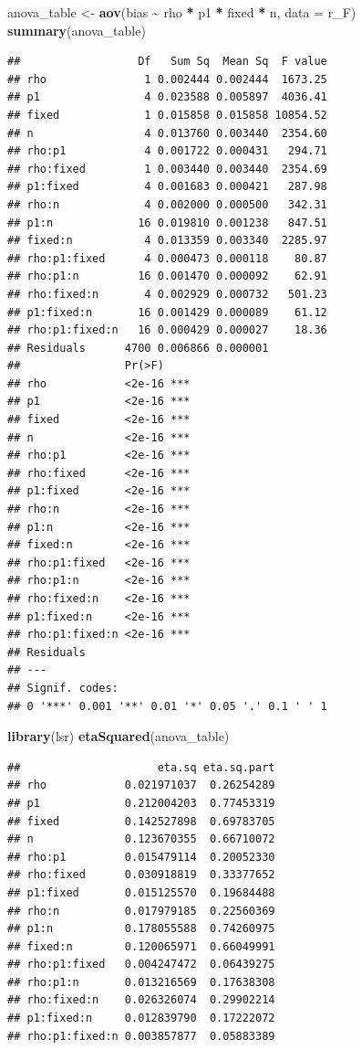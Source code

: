\documentclass[
]{book}
\newenvironment{Shaded}{\begin{snugshade}}{\end{snugshade}}
\newcommand{\AttributeTok}[1]{\textcolor[rgb]{0.13,0.29,0.53}{#1}}
\newcommand{\FunctionTok}[1]{\textcolor[rgb]{0.13,0.29,0.53}{\textbf{#1}}}
\newcommand{\NormalTok}[1]{#1}
\newcommand{\OtherTok}[1]{\textcolor[rgb]{0.56,0.35,0.01}{#1}}
\newcommand{\SpecialCharTok}[1]{\textcolor[rgb]{0.81,0.36,0.00}{\textbf{#1}}}
\begin{document}
\begin{Shaded}
\begin{Highlighting}[]
\NormalTok{anova\_table }\OtherTok{\textless{}{-}} \FunctionTok{aov}\NormalTok{(bias }\SpecialCharTok{\textasciitilde{}}\NormalTok{ rho }\SpecialCharTok{*}\NormalTok{ p1 }\SpecialCharTok{*}\NormalTok{ fixed }\SpecialCharTok{*}\NormalTok{ n, }\AttributeTok{data =}\NormalTok{ r\_F)}
\FunctionTok{summary}\NormalTok{(anova\_table)}
\end{Highlighting}
\end{Shaded}

\begin{verbatim}
##                  Df   Sum Sq  Mean Sq  F value
## rho               1 0.002444 0.002444  1673.25
## p1                4 0.023588 0.005897  4036.41
## fixed             1 0.015858 0.015858 10854.52
## n                 4 0.013760 0.003440  2354.60
## rho:p1            4 0.001722 0.000431   294.71
## rho:fixed         1 0.003440 0.003440  2354.69
## p1:fixed          4 0.001683 0.000421   287.98
## rho:n             4 0.002000 0.000500   342.31
## p1:n             16 0.019810 0.001238   847.51
## fixed:n           4 0.013359 0.003340  2285.97
## rho:p1:fixed      4 0.000473 0.000118    80.87
## rho:p1:n         16 0.001470 0.000092    62.91
## rho:fixed:n       4 0.002929 0.000732   501.23
## p1:fixed:n       16 0.001429 0.000089    61.12
## rho:p1:fixed:n   16 0.000429 0.000027    18.36
## Residuals      4700 0.006866 0.000001         
##                Pr(>F)    
## rho            <2e-16 ***
## p1             <2e-16 ***
## fixed          <2e-16 ***
## n              <2e-16 ***
## rho:p1         <2e-16 ***
## rho:fixed      <2e-16 ***
## p1:fixed       <2e-16 ***
## rho:n          <2e-16 ***
## p1:n           <2e-16 ***
## fixed:n        <2e-16 ***
## rho:p1:fixed   <2e-16 ***
## rho:p1:n       <2e-16 ***
## rho:fixed:n    <2e-16 ***
## p1:fixed:n     <2e-16 ***
## rho:p1:fixed:n <2e-16 ***
## Residuals                
## ---
## Signif. codes:  
## 0 '***' 0.001 '**' 0.01 '*' 0.05 '.' 0.1 ' ' 1
\end{verbatim}

\begin{Shaded}
\begin{Highlighting}[]
\FunctionTok{library}\NormalTok{(lsr)}
\FunctionTok{etaSquared}\NormalTok{(anova\_table)}
\end{Highlighting}
\end{Shaded}

\begin{verbatim}
##                     eta.sq eta.sq.part
## rho            0.021971037  0.26254289
## p1             0.212004203  0.77453319
## fixed          0.142527898  0.69783705
## n              0.123670355  0.66710072
## rho:p1         0.015479114  0.20052330
## rho:fixed      0.030918819  0.33377652
## p1:fixed       0.015125570  0.19684488
## rho:n          0.017979185  0.22560369
## p1:n           0.178055588  0.74260975
## fixed:n        0.120065971  0.66049991
## rho:p1:fixed   0.004247472  0.06439275
## rho:p1:n       0.013216569  0.17638308
## rho:fixed:n    0.026326074  0.29902214
## p1:fixed:n     0.012839790  0.17222072
## rho:p1:fixed:n 0.003857877  0.05883389
\end{verbatim}
\end{document}
